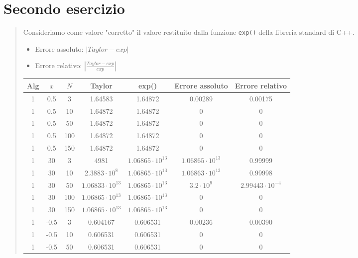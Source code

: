 \documentclass[12pt]{article}
\begin{document}
\section{Secondo esercizio}
\begin{quote}
    Consideriamo come valore "corretto" il valore restituito dalla funzione \texttt{exp()} della libreria standard di C++.
    \begin{itemize}
        \item Errore assoluto: $|Taylor-exp|$
        \item Errore relativo: $\left |\frac{Taylor-exp}{exp}\right |$
    \end{itemize}
    \begin{tabular}{| c | c | c | c | c | c | c |}
        \hline
        \textbf{Alg} & \textbf{$x$} & \textbf{$N$} & \textbf{Taylor} & \textbf{exp()} & \textbf{Errore assoluto} & \textbf{Errore relativo}\\
        \hline
        1 & 0.5 & 3 & 1.64583 & 1.64872 & 0.00289 & 0.00175 \\
        \hline
        1 & 0.5 & 10 & 1.64872 & 1.64872 & 0 & 0 \\
        \hline
        1 & 0.5 & 50 & 1.64872 & 1.64872 & 0 & 0 \\
        \hline 
        1 & 0.5 & 100 & 1.64872 & 1.64872 & 0 & 0 \\
        \hline
        1 & 0.5 & 150 & 1.64872 & 1.64872 & 0 & 0 \\
        \hline
        1 & 30 & 3 & 4981 & $1.06865\cdot10^{13}$ & $1.06865\cdot10^{13}$ & 0.99999 \\
        \hline
        1 & 30 & 10 & $2.3883\cdot10^{8}$ & $1.06865\cdot10^{13}$ & $1.06863\cdot10^{13}$ & 0.99998 \\
        \hline
        1 & 30 & 50 & $1.06833\cdot10^{13}$ & $1.06865\cdot10^{13}$ & $3.2\cdot10^{9}$ & $2.99443\cdot10^{-4}$ \\
        \hline
        1 & 30 & 100 & $1.06865\cdot10^{13}$ & $1.06865\cdot10^{13}$ & 0 & 0 \\
        \hline
        1 & 30 & 150 & $1.06865\cdot10^{13}$ & $1.06865\cdot10^{13}$ & 0 & 0 \\
        \hline
        1 & -0.5 & 3 & 0.604167 & 0.606531 & 0.00236 & 0.00390 \\
        \hline
        1 & -0.5 & 10 & 0.606531 & 0.606531 & 0 & 0 \\
        \hline
        1 & -0.5 & 50 & 0.606531 & 0.606531 & 0 & 0 \\
        \hline

\end{tabular}
\end{quote}
\end{document}

